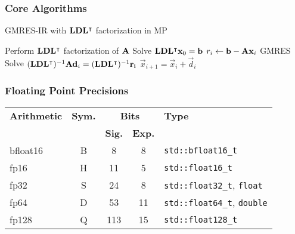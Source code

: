 \documentclass[t,12pt,numbers,fleqn]{beamer}
\begin{document}
\begin{frame}
\frametitle{Core Algorithms}

  \begin{algorithm}[H]
    \caption{GMRES-IR with \(\mathbf{L}\mathbf{D}\mathbf{L}^\intercal\) factorization in MP}
    \begin{algorithmic}[1]
      \State Perform \(\mathbf{L}\mathbf{D}\mathbf{L}^\intercal\) factorization of \(\mathbf{A}\) 
      \State Solve \(\mathbf{L}\mathbf{D}\mathbf{L}^\intercal \mathbf{x}_0 = \mathbf{b}\) 
      \State \(r_i \gets \mathbf{b} - \mathbf{A}\mathbf{x}_i\) 
      \State GMRES Solve \((\mathbf{L}\mathbf{D}\mathbf{L}^\intercal)^{-1}\mathbf{A}\mathbf{d}_i = (\mathbf{L}\mathbf{D}\mathbf{L}^\intercal)^{-1}\mathbf{r_i}\) 
      \State \(\vec{x}_{i + 1} = \vec{x}_i + \vec{d}_i\) 
      \EndFor
    \end{algorithmic}
  \end{algorithm}
\end{frame}


\begin{frame}
\frametitle{Floating Point Precisions}

\begin{table}[H]
  \centering
  \begin{tabularx}{\linewidth}{lcccl} \toprule
    \textbf{Arithmetic} & \textbf{Sym.} & \multicolumn{2}{c}{\textbf{Bits}} & \textbf{Type}                                 \\ \cline{3-4}
                  &         & \textbf{Sig.}            & \textbf{Exp.} &                               \\ \midrule
    bfloat16      & B       & 8                  & 8       & \texttt{std::bfloat16\_t}           \\
    fp16          & H       & 11                 & 5       & \texttt{std::float16\_t}            \\
    fp32          & S       & 24                 & 8       & \texttt{std::float32\_t}, \texttt{float}  \\
    fp64          & D       & 53                 & 11      & \texttt{std::float64\_t}, \texttt{double} \\
    fp128         & Q       & 113                & 15      & \texttt{std::float128\_t}           \\ \bottomrule
  \end{tabularx}
\end{table}
\end{frame}
\end{document}
